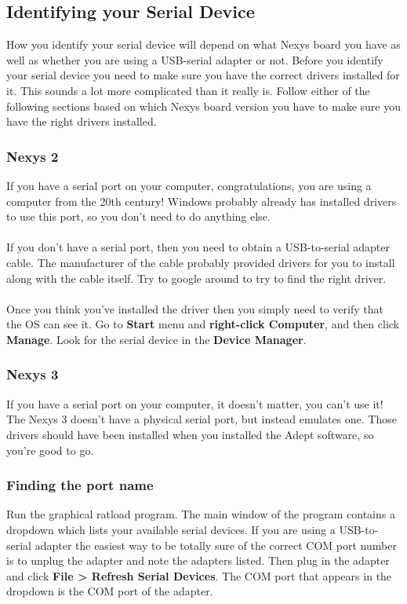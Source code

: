 \documentclass[notitlepage]{article}
\begin{document}
\subsection{Identifying your Serial Device}
\label{sec:serial_id}
How you identify your serial device will depend on what Nexys board you have as well as whether you are using a USB-serial adapter or not. Before you identify your serial device you need to make sure you have the correct drivers installed for it. This sounds a lot more complicated than it really is. Follow either of the following sections based on which Nexys board version you have to make sure you have the right drivers installed.

\subsubsection{Nexys 2}
If you have a serial port on your computer, congratulations, you are using a computer from the 20th century! Windows probably already has installed drivers to use this port, so you don't need to do anything else.\\\\
If you don't have a serial port, then you need to obtain a USB-to-serial adapter cable. The manufacturer of the cable probably provided drivers for you to install along with the cable itself. Try to google around to try to find the right driver.\\\\
Once you think you've installed the driver then you simply need to verify that the OS can see it. Go to \textbf{Start} menu and \textbf{right-click Computer}, and then click \textbf{Manage}. Look for the serial device in the \textbf{Device Manager}.

\subsubsection{Nexys 3}
If you have a serial port on your computer, it doesn't matter, you can't use it! The Nexys 3 doesn't have a physical serial port, but instead emulates one. Those drivers should have been installed when you installed the Adept software, so you're good to go.

\subsubsection{Finding the port name}
Run the graphical ratload program. The main window of the program contains a dropdown which lists your available serial devices. If you are using a USB-to-serial adapter the easiest way to be totally sure of the correct COM port number is to unplug the adapter and note the adapters listed. Then plug in the adapter and click \textbf{File > Refresh Serial Devices}. The COM port that appears in the dropdown is the COM port of the adapter.
\end{document}
